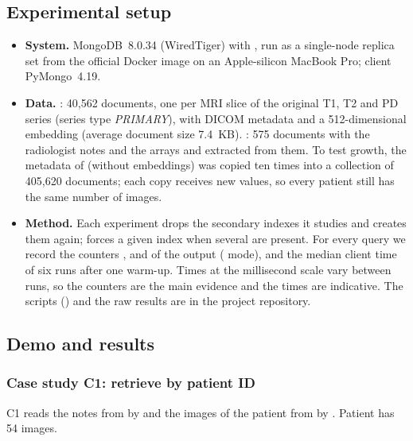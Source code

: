 \subsection{Experimental setup}
\label{sec:index-setup}
\begin{itemize}
  \item \textbf{System.} MongoDB~8.0.34 (WiredTiger) with , run as a single-node replica
        set from the official Docker image  on an Apple-silicon
        MacBook Pro; client PyMongo~4.19.
  \item \textbf{Data.} : 40{,}562 documents, one per MRI slice of the original
        T1, T2 and PD series (series type \emph{PRIMARY}), with DICOM metadata and a 512-dimensional embedding
        (average document size 7.4~KB). : 575 documents with the radiologist notes and
        the arrays  and  extracted from them. To test growth, the
        metadata of  (without embeddings) was copied ten times into a collection
         of 405{,}620 documents; each copy receives new  values,
        so every patient still has the same number of images.
  \item \textbf{Method.} Each experiment drops the secondary indexes it studies and creates them
        again;  forces a given index when several are present. For every query we record the
        counters ,  and  of the
         output ( mode), and the median client time of six runs
        after one warm-up.
        Times at the millisecond scale vary between runs, so the counters are the main evidence and
        the times are indicative. The scripts () and the raw results
        are in the project repository.
\end{itemize}

\subsection{Demo and results}
\label{sec:index-demo}

\subsubsection{Case study C1: retrieve by patient ID}
\label{sec:idx-c1}
C1 reads the notes from  by  and the images of the patient from
 by . Patient  has 54 images.

